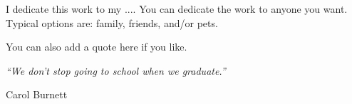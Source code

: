 \documentclass[main.tex]{subfiles}
\begin{document}
\newpage

I dedicate this work to my ....  You can dedicate the work to anyone you want.  Typical options are:
family, friends, and/or pets.

You can also add a quote here if you like.

\begin{flushleft}
\textit{``We don't stop going to school when we graduate.''}
\end{flushleft}

\begin{flushright}
Carol Burnett
\end{flushright}
\end{document}
